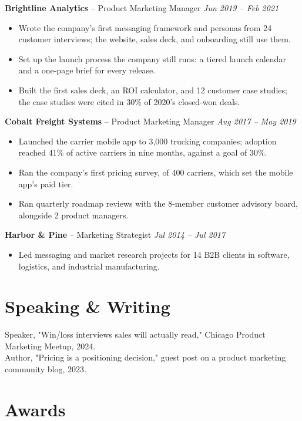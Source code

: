 \documentclass[11pt, letterpaper]{article}
\begin{document}
\vspace{2pt}
\textbf{Brightline Analytics} -- {Product Marketing Manager}
\hfill \textit{Jun 2019 – Feb 2021}
\begin{itemize}
  \item Wrote the company's first messaging framework and personas from 24 customer interviews; the website, sales deck, and onboarding still use them.
  \item Set up the launch process the company still runs: a tiered launch calendar and a one-page brief for every release.
  \item Built the first sales deck, an ROI calculator, and 12 customer case studies; the case studies were cited in 30\% of 2020's closed-won deals.
\end{itemize}
\vspace{2pt}
\textbf{Cobalt Freight Systems} -- {Product Marketing Manager}
\hfill \textit{Aug 2017 – May 2019}
\begin{itemize}
  \item Launched the carrier mobile app to 3,000 trucking companies; adoption reached 41\% of active carriers in nine months, against a goal of 30\%.
  \item Ran the company's first pricing survey, of 400 carriers, which set the mobile app's paid tier.
  \item Ran quarterly roadmap reviews with the 8-member customer advisory board, alongside 2 product managers.
\end{itemize}
\vspace{2pt}
\textbf{Harbor \& Pine} -- {Marketing Strategist}
\hfill \textit{Jul 2014 – Jul 2017}
\begin{itemize}
  \item Led messaging and market research projects for 14 B2B clients in software, logistics, and industrial manufacturing.
\end{itemize}
\vspace{2pt}
\section{Speaking \& Writing}

Speaker, "Win/loss interviews sales will actually read," Chicago Product Marketing Meetup, 2024. \\
Author, "Pricing is a positioning decision," guest post on a product marketing community blog, 2023.

\section{Awards}
\end{document}
